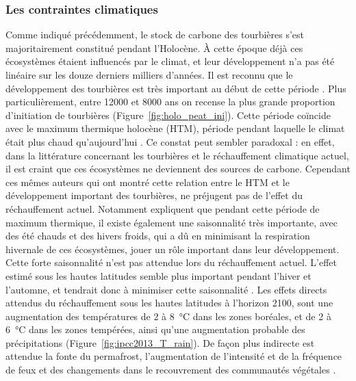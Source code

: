 \subsubsection{Les contraintes climatiques}

Comme indiqué précédemment, le stock de carbone des tourbières s'est majoritairement constitué pendant l'Holocène.
À cette époque déjà ces écosystèmes étaient influencés par le climat, et leur développement n'a pas été linéaire sur les douze derniers milliers d'années.
Il est reconnu que le développement des tourbières est très important au début de cette période \citep{smith2004,macdonald2006,yu2009}.
Plus particulièrement, entre \num{12000} et \num{8000} ans on recense la plus grande proportion d'initiation de tourbières (Figure~\ref{fig:holo_peat_ini}).
Cette période coïncide avec le maximum thermique holocène (HTM), période pendant laquelle le climat était plus chaud qu'aujourd’hui \citep{kaufman2004}.
Ce constat peut sembler paradoxal : en effet, dans la littérature concernant les tourbières et le réchauffement climatique actuel, il est craint que ces écosystèmes ne deviennent des sources de carbone.
Cependant ces mêmes auteurs qui ont montré cette relation entre le HTM et le développement important des tourbières, ne préjugent pas de l'effet du réchauffement actuel.
Notamment \citet{jones2010} expliquent que pendant cette période de maximum thermique, il existe également une saisonnalité très importante, avec des été chauds et des hivers froids, qui a dû en minimisant la respiration hivernale de ces écosystèmes, jouer un rôle important dans leur développement.
Cette forte saisonnalité n'est pas attendue lors du réchauffement actuel.
L'effet estimé sous les hautes latitudes semble plus important pendant l'hiver et l'automne, et tendrait donc à minimiser cette saisonnalité \citep{christensen2007}.
Les effets directs attendus du réchauffement sous les hautes latitudes à l'horizon 2100, sont une augmentation des températures de 2 à \SI{8}{\degreeCelsius} dans les zones boréales, et de 2 à \SI{6}{\degreeCelsius} dans les zones tempérées, ainsi  qu'une augmentation probable des précipitations (Figure~\ref{fig:ipcc2013_T_rain}).
De façon plus indirecte est attendue la fonte du permafrost, l'augmentation de l'intensité et de la fréquence de feux et des changements dans le recouvrement des communautés végétales \citep{christensen2013,frolking2011}.

